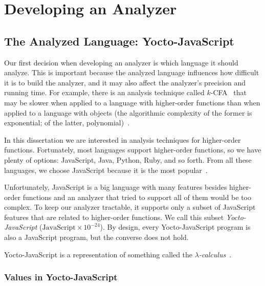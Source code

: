 \documentclass[12pt, oneside]{book}
\begin{document}
\chapter{Developing an Analyzer}


\section{The Analyzed Language: Yocto-JavaScript}
\label{The Analyzed Language: Yocto-JavaScript}

Our first decision when developing an analyzer is which language it should analyze. This is important because the analyzed language influences how difficult it is to build the analyzer, and it may also affect the analyzer’s precision and running time. For example, there is an analysis technique called $k$-CFA~\cite{k-cfa} that may be slower when applied to a language with higher-order functions than when applied to a language with objects (the algorithmic complexity of the former is exponential; of the latter, polynomial)~\cite{m-cfa}.

In this dissertation we are interested in analysis techniques for higher-order functions. Fortunately, most languages support higher-order functions, so we have plenty of options: JavaScript, Java, Python, Ruby, and so forth. From all these languages, we choose JavaScript because it is the most popular~\cite{stack-overflow-developer-survey, jet-brains-developer-survey}.

Unfortunately, JavaScript is a big language with many features besides higher-order functions and an analyzer that tried to support all of them would be too complex. To keep our analyzer tractable, it supports only a subset of JavaScript features that are related to higher-order functions. We call this subset \emph{Yocto-JavaScript} ($\mathrm{JavaScript} \times 10^{-24}$). By design, every Yocto-JavaScript program is also a JavaScript program, but the converse does not hold.

\begin{mdframed}[frametitle = Technical Term]
Yocto-JavaScript is a representation of something called the \emph{$\lambda$-calculus}~\cite[§~6]{understanding-computation}.
\end{mdframed}

\subsection{Values in Yocto-JavaScript}
\label{Values in Yocto-JavaScript}
\end{document}
